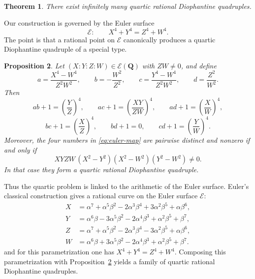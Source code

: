 \documentclass[11pt]{article}
\newtheorem{theorem}{Theorem}[section]
\newtheorem{proposition}[theorem]{Proposition}
\newcommand{\Q}{\mathbf{Q}}
\newcommand{\Eul}{\mathcal{E}}
\begin{document}
\begin{theorem}\label{thm:main-intro}
There exist infinitely many quartic rational Diophantine quadruples.
\end{theorem}

Our construction is governed by the Euler surface
\[
\Eul:\qquad X^4+Y^4=Z^4+W^4.
\]
The point is that a rational point on $\Eul$ canonically produces a quartic Diophantine quadruple of a special type.

\begin{proposition}\label{prop:euler-to-quadruple}
Let $(X:Y:Z:W)\in \Eul(\Q)$ with $ZW\neq 0$, and define
\begin{equation}\label{eq:euler-map}
 a=\frac{X^4-W^4}{Z^2W^2},\qquad
 b=-\frac{W^2}{Z^2},\qquad
 c=\frac{Y^4-W^4}{Z^2W^2},\qquad
 d=\frac{Z^2}{W^2}.
\end{equation}
Then
\[
ab+1=\left(\frac{Y}{Z}\right)^4,
\qquad
ac+1=\left(\frac{XY}{ZW}\right)^4,
\qquad
ad+1=\left(\frac{X}{W}\right)^4,
\]
\[
bc+1=\left(\frac{X}{Z}\right)^4,
\qquad
bd+1=0,
\qquad
cd+1=\left(\frac{Y}{W}\right)^4.
\]
Moreover, the four numbers in \eqref{eq:euler-map} are pairwise distinct and nonzero if and only if
\begin{equation}\label{eq:nondeg-euler}
XYZW\,(X^2-Y^2)(X^2-W^2)(Y^2-W^2)\neq 0.
\end{equation}
In that case they form a quartic rational Diophantine quadruple.
\end{proposition}

Thus the quartic problem is linked to the arithmetic of the Euler surface. Euler's classical construction gives a rational curve on the Euler surface $\Eul$:
\begin{align*}
X&=\alpha^7+\alpha^5\beta^2-2\alpha^3\beta^4+3\alpha^2\beta^5+\alpha\beta^6,\\
Y&=\alpha^6\beta-3\alpha^5\beta^2-2\alpha^4\beta^3+\alpha^2\beta^5+\beta^7,\\
Z&=\alpha^7+\alpha^5\beta^2-2\alpha^3\beta^4-3\alpha^2\beta^5+\alpha\beta^6,\\
W&=\alpha^6\beta+3\alpha^5\beta^2-2\alpha^4\beta^3+\alpha^2\beta^5+\beta^7.
\end{align*}
and for this parametrization one has $X^4+Y^4=Z^4+W^4$. Composing this parametrization with Proposition~\ref{prop:euler-to-quadruple} yields a family of quartic rational Diophantine quadruples.
\end{document}
